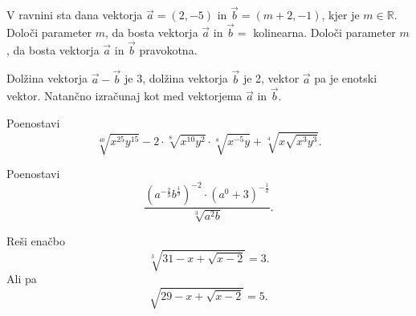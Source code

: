 \documentclass{izpit}
\begin{document}
\naloga[\tocke{6}]
  V ravnini sta dana vektorja $\vec{a}=(2,-5)$ in $\vec{b}=(m+2,-1)$, kjer je $m\in\mathbb{R}$.
  \podnaloga[3]
  Določi parameter $m$, da bosta vektorja $\vec{a}$ in $\vec{b}=$ kolinearna.
  \prostor[2]
  \podnaloga[3]
  Določi parameter $m$, da bosta vektorja $\vec{a}$ in $\vec{b}$ pravokotna.
  \prostor[2]

\naloga*[\tocke{5}]
  Dolžina vektorja $\vec{a}-\vec{b}$ je 3, dolžina vektorja $\vec{b}$ je 2, vektor $\vec{a}$ pa je enotski vektor. Natančno izračunaj kot med vektorjema $\vec{a}$ in $\vec{b}$.
  \prostor[5]

\naloga[\tocke{5}]
  Poenostavi%
  \[\sqrt[40]{x^{25}y^{15}}-2\cdot \sqrt[8]{x^{10}y^{2}}\cdot\sqrt[8]{x^{-5}y}+\sqrt[4]{x\sqrt{x^3 y^3}}.\]
  \prostor[1]


\naloga*[\tocke{4}]%
  Poenostavi
  \[\frac{\left(a^{-\frac{2}{3}}b^{\frac{1}{9}}\right)^{-2}\cdot\left(a^0 +3\right)^{-\frac{1}{2}}}{\sqrt[3]{a^2 b}}.\]
  \prostor[1]

\naloga[\tocke{5}]
  Reši enačbo
  \[\sqrt[3]{31-x+\sqrt{x-2}}=3.\]
  Ali pa
  \[\sqrt{29-x+\sqrt{x-2}}=5.\]
\end{document}
